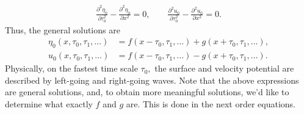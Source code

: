 \documentclass[10pt,reqno,oneside,a4paper]{article}
\begin{document}
\begin{align*}
\frac{\partial^2 \eta_{0}}{\partial \tau_0^2} - \frac{\partial^2\eta_{0}}{\partial x^2} = 0, \qquad \frac{\partial^2 u_{0}}{\partial \tau_0^2} - \frac{\partial^2 u_{0}}{\partial x^2} = 0.
\end{align*}
Thus, the general solutions are
\begin{align*}
\eta_{0}(x, \tau_0, \tau_1, \ldots) &= f(x- \tau_0, \tau_1, \ldots) + g(x+ \tau_0, \tau_1, \ldots), \\
u_{0}(x, \tau_0, \tau_1, \ldots) &= f(x- \tau_0, \tau_1, \ldots) - g(x+ \tau_0, \tau_1, \ldots).
\end{align*}
Physically, on the fastest time scale $\tau_0,$ the surface and velocity potential are described by left-going and right-going waves. Note that the above expressions are general solutions, and, to obtain more meaningful solutions, we'd like to determine what exactly $f$ and $g$ are. This is done in the next order equations.
\end{document}
